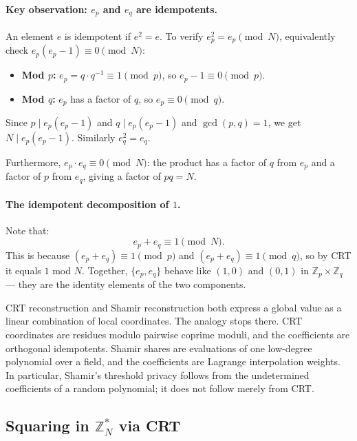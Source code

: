 \paragraph{Key observation: $e_p$ and $e_q$ are idempotents.}
An element $e$ is idempotent if $e^2 = e$. To verify $e_p^2 = e_p \pmod{N}$, equivalently check $e_p(e_p - 1) \equiv 0 \pmod{N}$:
\begin{itemize}
    \item \textbf{Mod $p$:} $e_p = q \cdot q^{-1} \equiv 1 \pmod{p}$, so $e_p - 1 \equiv 0 \pmod{p}$. \checkmark
    \item \textbf{Mod $q$:} $e_p$ has a factor of $q$, so $e_p \equiv 0 \pmod{q}$. \checkmark
\end{itemize}
Since $p \mid e_p(e_p-1)$ and $q \mid e_p(e_p-1)$ and $\gcd(p,q)=1$, we get $N \mid e_p(e_p-1)$. Similarly $e_q^2 = e_q$.

Furthermore, $e_p \cdot e_q \equiv 0 \pmod{N}$: the product has a factor of $q$ from $e_p$ and a factor of $p$ from $e_q$, giving a factor of $pq = N$.

\paragraph{The idempotent decomposition of $1$.} Note that:
\[
    e_p + e_q \equiv 1 \pmod{N}.
\]
This is because $(e_p + e_q) \equiv 1 \pmod{p}$ and $(e_p + e_q) \equiv 1 \pmod{q}$, so by CRT it equals $1$ mod $N$. Together, $\{e_p, e_q\}$ behave like $(1,0)$ and $(0,1)$ in $\mathbb{Z}_p \times \mathbb{Z}_q$ — they are the identity elements of the two components.

\begin{remark}
CRT reconstruction and Shamir reconstruction both express a global value as a linear combination of local coordinates. The analogy stops there. CRT coordinates are residues modulo pairwise coprime moduli, and the coefficients are orthogonal idempotents. Shamir shares are evaluations of one low-degree polynomial over a field, and the coefficients are Lagrange interpolation weights. In particular, Shamir's threshold privacy follows from the undetermined coefficients of a random polynomial; it does not follow merely from CRT.
\end{remark}

\subsection{Squaring in \texorpdfstring{$\mathbb{Z}_N^*$}{the unit group modulo N} via CRT}

